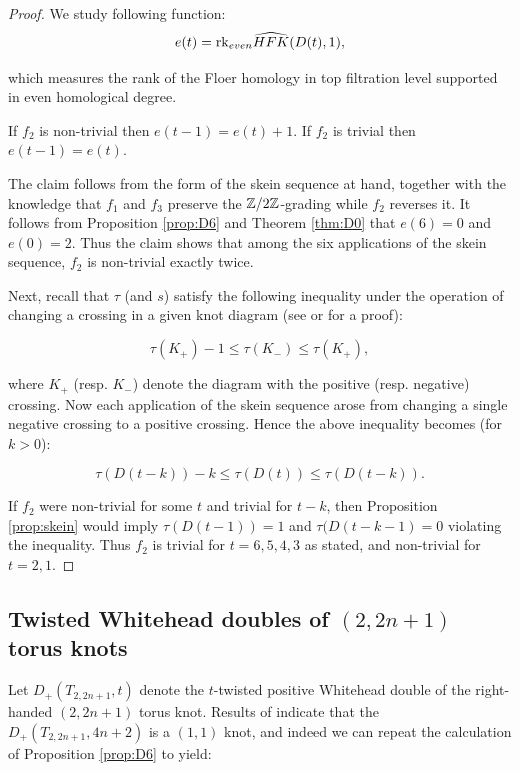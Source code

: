 \begin{proof}  We study following function: $$e(t)=\mathrm{rk}_{even} \widehat{HFK}(D(t),1),$$

\noindent which measures the rank of the Floer homology in top filtration level supported in even homological degree.	

  If $f_2$ is non-trivial then $e(t-1)=e(t)+1$. If $f_2$ is trivial then $e(t-1)=e(t)$.

The claim follows from the form of the skein sequence at hand, together with the knowledge that $f_1$ and $f_3$ preserve the $\mathbb{Z}/2\mathbb{Z}$-grading while $f_2$ reverses it.  It follows from Proposition \ref{prop:D6} and Theorem \ref{thm:D0} that $e(6)=0$ and $e(0)=2$.  Thus the claim shows that among the six applications of the skein sequence, $f_2$ is non-trivial exactly twice.  
	
	Next, recall that $\tau$ (and $s$) satisfy the following inequality under the operation of changing a crossing in a given knot diagram (see \cite{Livingston1} or \cite{FourBall} for a proof):

$$\tau(K_+)-1\le \tau(K_-) \le \tau(K_+),$$

\noindent where $K_+$ (resp. $K_-$) denote the diagram with the positive (resp. negative) crossing. 
Now each application of the skein sequence arose from changing a single negative crossing to a positive crossing.  Hence the above inequality becomes (for $k>0$):

$$\tau(D(t-k))-k\le \tau(D(t)) \le \tau(D(t-k)).$$

If $f_2$ were non-trivial for some $t$ and trivial for $t-k$, then Proposition \ref{prop:skein} would imply $\tau(D(t-1))=1$ and $\tau(D(t-k-1)= 0$ violating the inequality.  Thus $f_2$ is trivial for $t=6,5,4,3$ as stated, and non-trivial for $t=2,1$.  
\end{proof}



\subsection{Twisted Whitehead doubles of $(2,2n+1)$ torus knots}

Let $D_+(T_{2,2n+1},t)$  denote the $t$-twisted positive Whitehead double of the right-handed $(2,2n+1)$ torus knot. Results of \cite{Morimoto} indicate that the $D_+(T_{2,2n+1},4n+2)$ is a $(1,1)$ knot, and indeed we can repeat the calculation of Proposition \ref{prop:D6} to yield:



